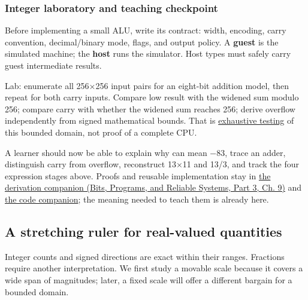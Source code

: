 \subsubsection{Integer laboratory and teaching checkpoint}\label{01-foundations-i-ch001-integer-laboratory-and-teaching-checkpoint}

\hypertarget{01-foundations-i-ch001-integer-laboratory-and-teaching-checkpoint}{}

Before implementing a small ALU, write its contract: width, encoding, carry convention, decimal/binary mode, flags, and output policy. A \textbf{guest} is the simulated machine; the \textbf{host} runs the simulator. Host types must safely carry guest intermediate results.

Lab: enumerate all 256×256 input pairs for an eight-bit addition model, then repeat for both carry inputs. Compare low result with the widened sum modulo 256; compare carry with whether the widened sum reaches 256; derive overflow independently from signed mathematical bounds. That is \hyperref[appendix-05db24ccc28a]{exhaustive testing} of this bounded domain, not proof of a complete CPU.

A learner should now be able to explain why  can mean −83, trace an adder, distinguish carry from overflow, reconstruct 13×11 and 13/3, and track the four expression stages above. Proofs and reusable implementation stay in \href{../01-Bits-Programs-and-Reliable-Systems-P03/main.pdf\#01-foundations-i-ch011-m002---signed-representations-adders-and-arithmetic-policies}{the derivation companion (Bits, Programs, and Reliable Systems, Part 3, Ch. 9)} and \hyperref[appendix-4e2236f53445-m002---exhaustive-8-bit-addition-oracle-and-saturation]{the code companion}; the meaning needed to teach them is already here.

\subsection{A stretching ruler for real-valued quantities}\label{01-foundations-i-ch001-a-stretching-ruler-for-real-valued-quantities}

\hypertarget{01-foundations-i-ch001-a-stretching-ruler-for-real-valued-quantities}{}

Integer counts and signed directions are exact within their ranges. Fractions require another interpretation. We first study a movable scale because it covers a wide span of magnitudes; later, a fixed scale will offer a different bargain for a bounded domain.


